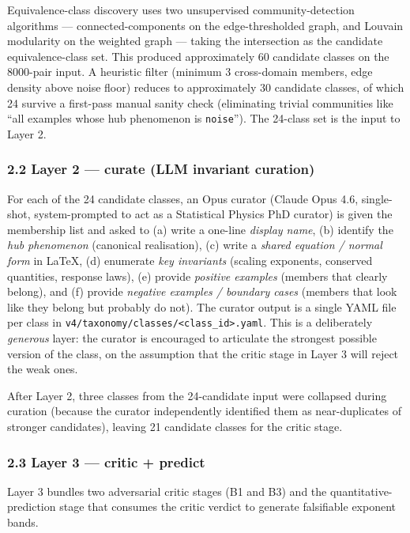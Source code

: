 \documentclass[
  letterpaper,
  11pt]{article}
\begin{document}
Equivalence-class discovery uses two unsupervised community-detection
algorithms --- connected-components on the edge-thresholded graph, and
Louvain modularity on the weighted graph --- taking the intersection as
the candidate equivalence-class set. This produced approximately 60
candidate classes on the 8000-pair input. A heuristic filter (minimum 3
cross-domain members, edge density above noise floor) reduces to
approximately 30 candidate classes, of which 24 survive a first-pass
manual sanity check (eliminating trivial communities like ``all examples
whose hub phenomenon is \texttt{noise}''). The 24-class set is the input
to Layer 2.

\subsubsection{2.2 Layer 2 --- curate (LLM invariant
curation)}\label{layer-2-curate-llm-invariant-curation}

For each of the 24 candidate classes, an Opus curator (Claude Opus 4.6,
single-shot, system-prompted to act as a Statistical Physics PhD
curator) is given the membership list and asked to (a) write a one-line
\emph{display name}, (b) identify the \emph{hub phenomenon} (canonical
realisation), (c) write a \emph{shared equation / normal form} in LaTeX,
(d) enumerate \emph{key invariants} (scaling exponents, conserved
quantities, response laws), (e) provide \emph{positive examples}
(members that clearly belong), and (f) provide \emph{negative examples /
boundary cases} (members that look like they belong but probably do
not). The curator output is a single YAML file per class in
\texttt{v4/taxonomy/classes/\textless{}class\_id\textgreater{}.yaml}.
This is a deliberately \emph{generous} layer: the curator is encouraged
to articulate the strongest possible version of the class, on the
assumption that the critic stage in Layer 3 will reject the weak ones.

After Layer 2, three classes from the 24-candidate input were collapsed
during curation (because the curator independently identified them as
near-duplicates of stronger candidates), leaving 21 candidate classes
for the critic stage.

\subsubsection{2.3 Layer 3 --- critic +
predict}\label{layer-3-critic-predict}

Layer 3 bundles two adversarial critic stages (B1 and B3) and the
quantitative-prediction stage that consumes the critic verdict to
generate falsifiable exponent bands.
\end{document}
